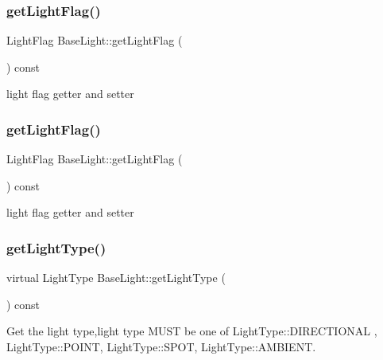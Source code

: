 \subsubsection{\texorpdfstring{get\+Light\+Flag()}{getLightFlag()}\hspace{0.1cm}{\footnotesize\ttfamily [1/2]}}
{\footnotesize\ttfamily Light\+Flag Base\+Light\+::get\+Light\+Flag (\begin{DoxyParamCaption}{ }\end{DoxyParamCaption}) const\hspace{0.3cm}{\ttfamily [inline]}}

light flag getter and setter \mbox{\label{classBaseLight_a88a41452d717c2df935359bf82ed5946}} 
\subsubsection{\texorpdfstring{get\+Light\+Flag()}{getLightFlag()}\hspace{0.1cm}{\footnotesize\ttfamily [2/2]}}
{\footnotesize\ttfamily Light\+Flag Base\+Light\+::get\+Light\+Flag (\begin{DoxyParamCaption}{ }\end{DoxyParamCaption}) const\hspace{0.3cm}{\ttfamily [inline]}}

light flag getter and setter \mbox{\label{classBaseLight_a620db25fed828de7328b83587f388030}} 
\subsubsection{\texorpdfstring{get\+Light\+Type()}{getLightType()}\hspace{0.1cm}{\footnotesize\ttfamily [1/2]}}
{\footnotesize\ttfamily virtual Light\+Type Base\+Light\+::get\+Light\+Type (\begin{DoxyParamCaption}{ }\end{DoxyParamCaption}) const\hspace{0.3cm}{\ttfamily [pure virtual]}}

Get the light type,light type M\+U\+ST be one of Light\+Type\+::\+D\+I\+R\+E\+C\+T\+I\+O\+N\+AL , Light\+Type\+::\+P\+O\+I\+NT, Light\+Type\+::\+S\+P\+OT, Light\+Type\+::\+A\+M\+B\+I\+E\+NT. 

